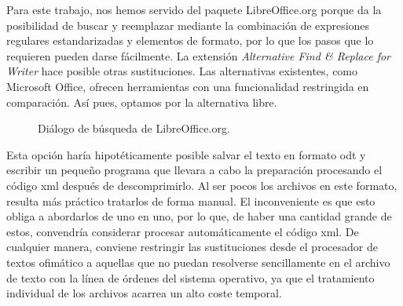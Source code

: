 Para este trabajo, nos hemos servido del paquete LibreOffice.org porque da la posibilidad de buscar y reemplazar mediante la combinación de expresiones regulares estandarizadas y elementos de formato, por lo que los pasos que lo requieren pueden darse fácilmente. La extensión \textit{Alternative Find \& Replace for Writer} hace posible otras sustituciones. Las alternativas existentes, como Microsoft Office, ofrecen herramientas con una funcionalidad restringida en comparación. Así pues, optamos por la alternativa libre.

\begin{figure}[!ht]
	\centering\small
	\caption{Diálogo de búsqueda de LibreOffice.org.}
	\label{fig:searchandreplace}
\end{figure}	

Esta opción haría hipotéticamente posible salvar el texto en formato \ac{odt} y escribir un pequeño programa que llevara a cabo la preparación procesando el código \ac{xml} después de descomprimirlo. Al ser pocos los archivos en este formato, resulta más práctico tratarlos de forma manual. El inconveniente es que esto obliga a abordarlos de uno en uno, por lo que, de haber una cantidad grande de estos, convendría considerar procesar automáticamente el código \ac{xml}. De cualquier manera, conviene restringir las sustituciones desde el procesador de textos ofimático a aquellas que no puedan resolverse sencillamente en el archivo de texto con la línea de órdenes del sistema operativo, ya que el tratamiento individual de los archivos acarrea un alto coste temporal.

